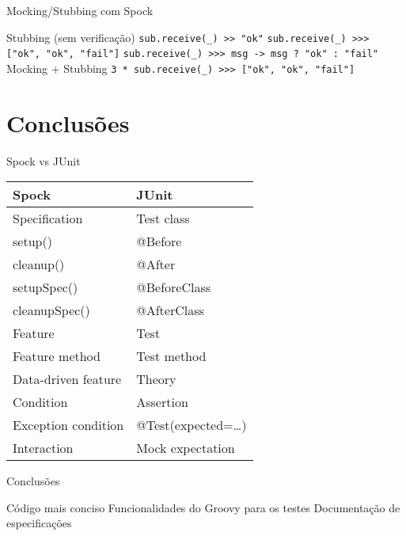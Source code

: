 \documentclass{beamer}
\begin{document}
\begin{frame}{Mocking/Stubbing com Spock}
 \begin{outline}
    Stubbing (sem verificação)
     \texttt{sub.receive(_) >> "ok"}
     \texttt{sub.receive(_) >>> ["ok", "ok", "fail"]}
     \texttt{sub.receive(_) >>> {msg -> msg ? "ok" : "fail"}}
    Mocking + Stubbing
     \texttt{3 * sub.receive(_) >>> ["ok", "ok", "fail"]}
 \end{outline}
\end{frame}

\section{Conclusões}

\begin{frame}{Spock vs JUnit}
  \begin{table}[]
    \begin{tabular}{@{}ll@{}}
      \toprule
      Spock               & JUnit              \\ \midrule
      Specification       & Test class         \\
      setup()             & @Before            \\
      cleanup()           & @After             \\
      setupSpec()         & @BeforeClass       \\
      cleanupSpec()       & @AfterClass        \\
      Feature             & Test               \\
      Feature method      & Test method        \\
      Data-driven feature & Theory             \\
      Condition           & Assertion          \\
      Exception condition & @Test(expected=…​)  \\
      Interaction         & Mock expectation   \\ \bottomrule
    \end{tabular}
  \end{table}
\end{frame}

\begin{frame}{Conclusões}
 \begin{outline}
    Código mais conciso
    Funcionalidades do Groovy para os testes
    Documentação de especificações
 \end{outline}
\end{frame}
\end{document}
